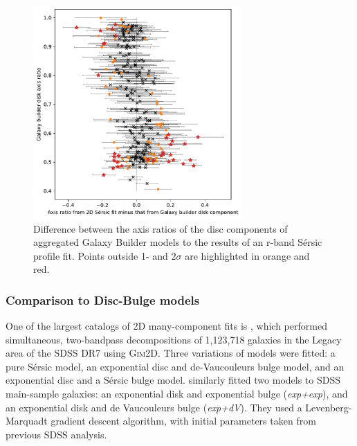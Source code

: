 \documentclass[../main.tex]{subfiles}
\begin{document}
\begin{figure}
  \includegraphics[width=8cm]{images__results/gzb-agg-nsa-comparison.pdf}
  \caption{Difference between the axis ratios of the disc components of aggregated Galaxy Builder models to the results of an r-band S\'ersic profile fit. Points outside 1- and $2\sigma$ are highlighted in orange and red.}
  \label{fig:ax_ratio_comparison}
\end{figure}


\subsubsection{Comparison to Disc-Bulge models}

One of the largest catalogs of 2D many-component fits is \citet{Simard2011:1107.1518v1}, which performed simultaneous, two-bandpass decompositions of 1,123,718 galaxies in the Legacy area of the SDSS DR7 using \textsc{Gim2D}. Three variations of models were fitted: a pure S\'ersic model, an exponential disc and de-Vaucouleurs bulge model, and an exponential disc and a S\'ersic bulge model. \citet{2012MNRAS.421.2277L} similarly fitted two models to SDSS main-sample galaxies: an exponential disk and exponential bulge (\textit{exp+exp}), and an exponential disk and de Vaucouleurs bulge (\textit{exp+dV}). They used a Levenberg-Marquadt gradient descent algorithm, with initial parameters taken from previous SDSS analysis.
\end{document}
